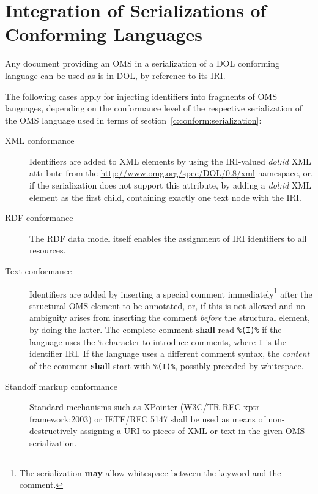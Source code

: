 \documentclass[10pt,fleqn,%
\ifpretendfinal
final%
\else
draft%
\fi,
]{scrreprt}
\newcommand*{\shall}{\textbf{shall}\xspace}
\newcommand*{\may}{\textbf{may}\xspace}
\newcommand{\sclause}[1]{\section{#1}}
\newcommand{\nisref}[1]{#1}
\begin{document}

\sclause{Integration of Serializations of Conforming Languages}
\label{sec:existing-serialization}
Any document providing an OMS in a serialization of a DOL conforming
language can be used as-is in DOL, by reference to its IRI.

The following cases apply for injecting identifiers into fragments of OMS languages, depending on the conformance level of the respective serialization of the OMS language used in terms of section~\ref{c:conform:serialization}:
\begin{description}
\item[XML conformance] Identifiers are added to XML elements by using the IRI-valued \textit{dol:id} XML attribute from the \url{http://www.omg.org/spec/DOL/0.8/xml} namespace, or, if the serialization does not support this attribute, by adding a \textit{dol:id} XML element as the first child, containing exactly one text node with the IRI.
\item[RDF conformance] The RDF data model itself enables the assignment of IRI identifiers to all resources.
\item[Text conformance] Identifiers are added by inserting a special comment immediately\footnote{The serialization \may allow whitespace between the keyword and the comment.} after the structural OMS element to be annotated, or, if this is not allowed and no ambiguity arises from inserting the comment \emph{before} the structural element, by doing the latter.  The complete comment \shall read \texttt{\%(I)\%} if the language uses the \texttt{\%} character to introduce comments, where \texttt{I} is the identifier IRI.  If the language uses a different comment syntax, the \emph{content} of the comment \shall start with \texttt{\%(I)\%}, possibly preceded by whitespace.
\item[Standoff markup conformance] Standard mechanisms such as XPointer (\nisref{W3C/TR REC-xptr-framework:2003}) or \nisref{IETF/RFC 5147} shall be used as means of non-destructively assigning a URI to pieces of XML or text in the given OMS serialization.
\end{description}
\end{document}
